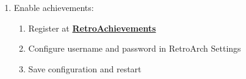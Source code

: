 \begin{enumerate}
    \item Enable achievements:
    \begin{enumerate}
        \item Register at \href{https://retroachievements.org}{\textbf{\color{blue}RetroAchievements}}
        \item Configure username and password in RetroArch Settings
        \item Save configuration and restart
    \end{enumerate}
\end{enumerate}